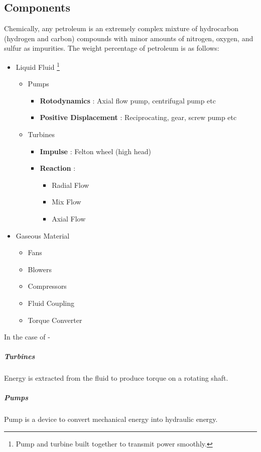 \documentclass{article}
\begin{document}
\subsection*{Components}
Chemically, any petroleum is an extremely complex mixture of hydrocarbon (hydrogen and carbon) compounds with minor amounts of nitrogen, oxygen, and sulfur as impurities. The weight percentage of petroleum is as follows:

\begin{itemize}[label=$\circ$]
    \item Liquid Fluid \footnote{Pump and turbine built together to transmit power smoothly.}
    \begin{itemize}[label=\textendash]
        \item Pumps
        \begin{itemize}[label=\textbullet]
            \item \textbf{Rotodynamics} : Axial flow pump, centrifugal pump etc
            \item \textbf{Positive Displacement} : Reciprocating, gear, screw pump etc
        \end{itemize}
        \item Turbines
        \begin{itemize}[label=\textbullet]
            \item \textbf{Impulse} : Felton wheel (high head)
            \item \textbf{Reaction} : 
            \begin{itemize}[label=\textasteriskcentered]
            		\item Radial Flow
            		\item Mix Flow
            		\item Axial Flow
            \end{itemize}
        \end{itemize}
    \end{itemize}
    \item Gaseous Material
    		\begin{itemize}
    			\item Fans
    			\item Blowers
    			\item Compressors
    			\item Fluid Coupling
    			\item Torque Converter 
    		\end{itemize}
\end{itemize}
\vspace{1cm}
In the case of - 
\subparagraph{Turbines}
Energy is extracted from the fluid to produce torque on a rotating shaft.
\subparagraph{Pumps}
Pump is a device to convert mechanical energy into hydraulic energy.
\\
\end{document}
